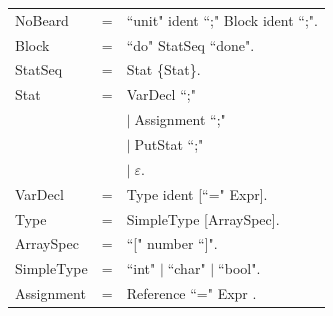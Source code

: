 \documentclass[11pt]{report}
\newenvironment{grammar}
	{\begin{tabular}[b]{lcl}}
	{\end{tabular}}
\newcommand{\alternative}{$\mid \;$}
\newcommand{\emptystring}{$\varepsilon$}
\begin{document}
	\begin{grammar}
	NoBeard & = & ``unit" ident ``;" Block ident ``;".\\
	
	Block & = &  ``do" StatSeq ``done".\\
	
	StatSeq & = & Stat \{Stat\}. \\
	
	Stat & = & VarDecl ``;" \\
	&& \alternative Assignment ``;"\\
	&& \alternative PutStat ``;" \\
	&& \alternative \emptystring. \\
	
	VarDecl & = & Type ident [``=" Expr]. \\
	
	Type & = & SimpleType [ArraySpec]. \\
	
	
	ArraySpec & = & ``[" number ``]". \\
	
	SimpleType & = & ``int" \alternative ``char" \alternative ``bool". \\
	
	
	
	
	
	
	Assignment &=& Reference ``=" Expr . \\
	

	

\end{grammar}
\end{document}
